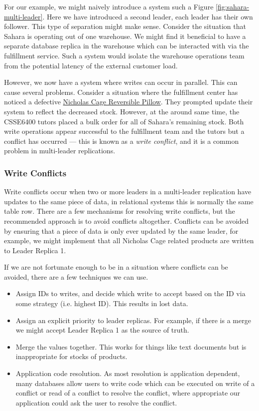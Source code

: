 For our example,
we might naively introduce a system such a Figure \ref{fig:sahara-multi-leader}.
Here we have introduced a second leader, each leader has their own follower.
This type of separation might make sense.
Consider the situation that Sahara is operating out of one warehouse.
We might find it beneficial to have a separate database replica in the warehouse which can be interacted with via the fulfillment service.
Such a system would isolate the warehouse operations team from the potential latency of the external customer load.

However, we now have a system where writes can occur in parallel.
This can cause several problems.
Consider a situation where the fulfillment center has noticed a defective \href{https://www.amazon.com.au/dp/B09LYDDDR1}{Nicholas Cage Reversible Pillow}.
They prompted update their system to reflect the decreased stock.
However, at the around same time,
the CSSE6400 tutors placed a bulk order for all of Sahara's remaining stock.
Both write operations appear successful to the fulfillment team and the tutors but a conflict has occurred --- this is known as a \textsl{write conflict},
and it is a common problem in multi-leader replications. 

\subsubsection*{Write Conflicts}
Write conflicts occur when two or more leaders in a multi-leader replication have updates to the same piece of data,
in relational systems this is normally the same table row.
There are a few mechanisms for resolving write conflicts,
but the recommended approach is to avoid conflicts altogether.
Conflicts can be avoided by ensuring that a piece of data is only ever updated by the same leader,
for example, we might implement that all Nicholas Cage related products are written to Leader Replica 1.

If we are not fortunate enough to be in a situation where conflicts can be avoided,
there are a few techniques we can use.

\begin{itemize}
    \item Assign IDs to writes, and decide which write to accept based on the ID via some strategy (i.e. highest ID). This results in lost data.
    \item Assign an explicit priority to leader replicas. For example, if there is a merge we might accept Leader Replica 1 as the source of truth.
    \item Merge the values together. This works for things like text documents but is inappropriate for stocks of products.
    \item Application code resolution. As most resolution is application dependent, many databases allow users to write code which can be executed on write of a conflict or read of a conflict to resolve the conflict, where appropriate our application could ask the user to resolve the conflict.
\end{itemize}

